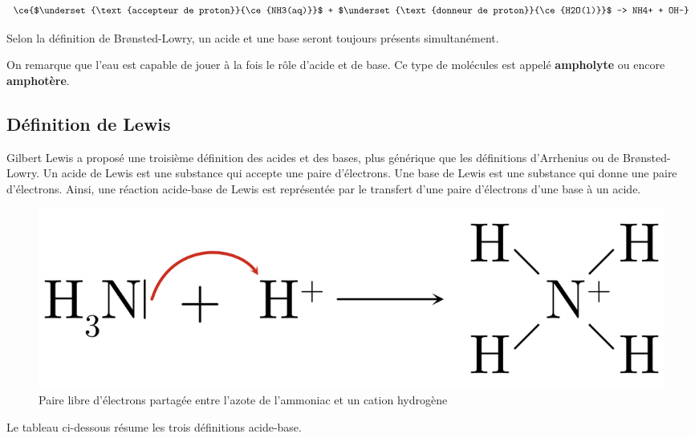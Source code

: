 \documentclass[
  11pt,
  a4paper,
  openany]{book}
\begin{document}
\[
\ce{$\underset{\text{accepteur de proton}}{\ce{NH3(aq)}}$ + $\underset{\text{donneur de proton}}{\ce{H2O(l)}}$ -> NH4+ + OH-}
\]

Selon la définition de Brønsted-Lowry, un acide et une base seront toujours présents simultanément.

On remarque que l'eau est capable de jouer à la fois le rôle d'acide et de base. Ce type de molécules est appelé \textbf{ampholyte} ou encore \textbf{amphotère}.

\subsection{Définition de Lewis}\label{duxe9finition-de-lewis}

Gilbert Lewis a proposé une troisième définition des acides et des bases, plus générique que les définitions d'Arrhenius ou de Brønsted-Lowry. Un acide de Lewis est une substance qui accepte une paire d'électrons. Une base de Lewis est une substance qui donne une paire d'électrons. Ainsi, une réaction acide-base de Lewis est représentée par le transfert d'une paire d'électrons d'une base à un acide.

\begin{figure}

{\centering \includegraphics[width=0.33\linewidth]{images/acides-bases-2} 

}

\caption{Paire libre d'électrons partagée entre l'azote de l'ammoniac et un cation hydrogène}\label{fig:acides-bases-2}
\end{figure}
\clearpage

Le tableau ci-dessous résume les trois définitions acide-base.
\end{document}
